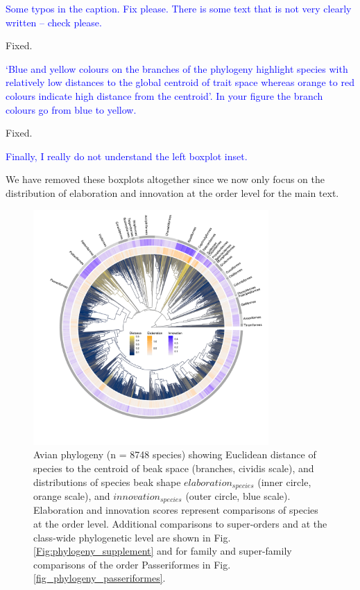 \documentclass[12pt,letterpaper]{article}
\begin{document}
{\textcolor{blue}{Some typos in the caption. Fix please. There is some text that is not very clearly written – check please.}

Fixed.

\textcolor{blue}{‘Blue and yellow colours on the branches of the phylogeny highlight species with relatively low distances to the global centroid of trait space whereas orange to red colours indicate high distance from the centroid’. In your figure the branch colours go from blue to yellow.}

Fixed.


\textcolor{blue}{Finally, I really do not understand the left boxplot inset.}

We have removed these boxplots altogether since we now only focus on the distribution of elaboration and innovation at the order level for the main text.

\begin{figure}[!htbp]
\centering
   \includegraphics[width=0.8\textwidth]{Figures/InnovElabTree_main_text_revision.pdf}
\caption{Avian phylogeny (n = 8748 species) showing Euclidean distance of species to the centroid of beak space (branches, cividis scale), and distributions of species beak shape $elaboration_{species}$ (inner circle, orange scale), and $innovation_{species}$ (outer circle, blue scale).
Elaboration and innovation scores represent comparisons of species at the order level.
Additional comparisons to super-orders and at the class-wide phylogenetic level are shown in Fig. \ref{Fig:phylogeny_supplement} and for family and super-family comparisons of the order Passeriformes in Fig. \ref{fig_phylogeny_passeriformes}.
}
\label{Fig:phylogeny}
\end{figure}
\bigskip

}
\end{document}
